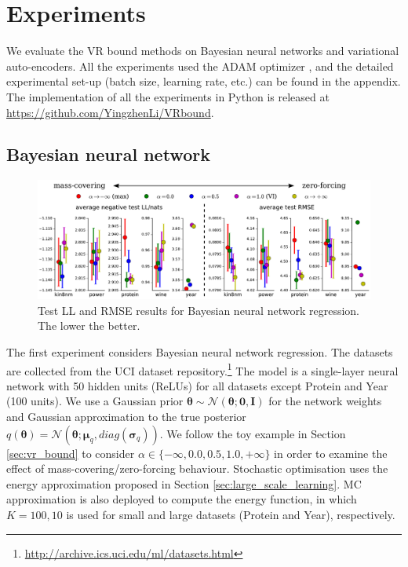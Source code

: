 \section{Experiments}
We evaluate the VR bound methods on Bayesian neural networks and variational auto-encoders. All the experiments used the ADAM optimizer \cite{kingma:adam}, and the detailed experimental set-up (batch size, learning rate, etc.) can be found in the appendix. The implementation of all the experiments in Python is released at \url{https://github.com/YingzhenLi/VRbound}.

\subsection{Bayesian neural network}

\begin{figure}[t]
 \centering
 \includegraphics[width=1.0\linewidth]{figs/results_selected_bnn.pdf} 
 \vspace{-0.15in}
 \caption{Test LL and RMSE results for Bayesian neural network regression. The lower the better.}
 \label{fig:bnn_results}
\end{figure}

The first experiment considers Bayesian neural network regression. The datasets are collected from the UCI dataset repository.\footnote{\url{http://archive.ics.uci.edu/ml/datasets.html}} The model is a single-layer neural network with 50 hidden units (ReLUs) for all datasets except Protein and Year (100 units). We use a Gaussian prior $\bm{\theta} \sim \mathcal{N}(\bm{\theta}; \bm{0}, \bm{I})$ for the network weights and Gaussian approximation to the true posterior $q(\bm{\theta}) = \mathcal{N}(\bm{\theta}; \bm{\mu}_q, diag(\bm{\sigma}_q))$. We follow the toy example in Section \ref{sec:vr_bound} to consider $\alpha \in \{-\infty, 0.0, 0.5, 1.0, +\infty \}$ in order to examine the effect of mass-covering/zero-forcing behaviour. Stochastic optimisation uses the energy approximation proposed in Section \ref{sec:large_scale_learning}. MC approximation is also deployed to compute the energy function, in which $K=100, 10$ is used for small and large datasets (Protein and Year), respectively.

